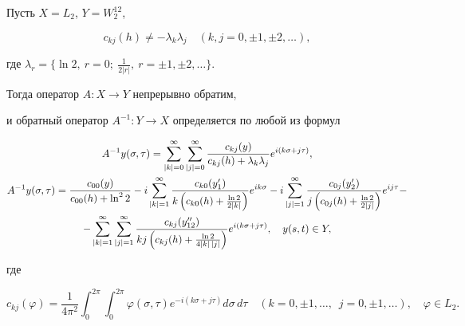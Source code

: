 \begin{lem} 


Пусть $X=L_2$, $Y=W^{12}_2$, 


\begin{equation} 


c_{k j}(h)\ne-\lambda_k\lambda_j\quad 


(k,j=0,\pm1,\pm2,\dotsc), 


\end{equation} 


где $\lambda_r=\{\ln2,\ r=0;\ \frac{1}{2|r|},\ r=\pm1,\pm2,\dotsc\}$. 


Тогда оператор $A:X\to Y$ непрерывно обратим, 


и обратный оператор $A^{-1}:Y\to X$ определяется по любой из формул 


\begin{gather} 


A^{-1}y(\sigma,\tau)=\sum^\infty_{|k|=0}\sum^\infty_{|j|=0} 


\frac{c_{k j}(y)}{c_{k j}(h)+\lambda_k\lambda_j} 


e^{i(k\sigma+j\tau)},\\ 


% 


A^{-1}y(\sigma,\tau)=\frac{c_{00}(y)}{c_{00}(h)+\ln^2 2}-i 


\sum^\infty_{|k|=1}\frac{c_{k0}(y'_1)} 


{k\left(c_{k0}(h)+\frac{\ln2}{2|k|}\right)}e^{i k\sigma}-i 


\sum^\infty_{|j|=1}\frac{c_{0j}(y'_2)} 


{j\left(c_{0j}(h)+\frac{\ln2}{2|j|}\right)} 


e^{i j\tau}-\notag \\ 


% 


-\sum^\infty_{|k|=1}\sum^\infty_{|j|=1} 


\frac{c_{k j}(y''_{12})} 


{kj\left(c_{k j}(h)+\frac{\ln2}{4|k|\,|j|}\right)} 


e^{i(k\sigma+j\tau)},\quad y(s,t)\in Y,\notag 


\end{gather} 


где 


$$ 


c_{k j}(\varphi)=\frac{1}{4\pi^2}\int^{2\pi}_0\int^{2\pi}_0 


\varphi(\sigma,\tau)e^{-i(k\sigma+j\tau)}d\sigma\,d\tau\quad 


(k=0,\pm1,\dotsc,\ \; j=0,\pm1,\dotsc),\quad \varphi\in L_2. 


$$ 


\end{lem} 


